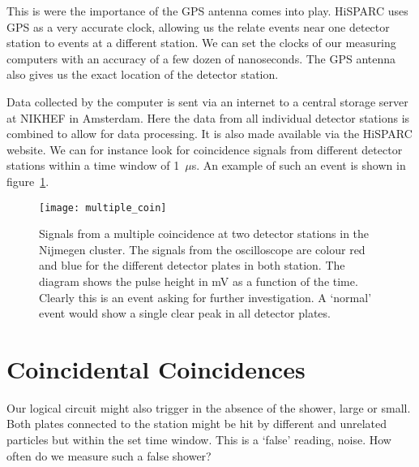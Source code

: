 This is were the importance of the GPS antenna comes into play. HiSPARC uses GPS as a very accurate clock, allowing us the relate events near one detector station to events at a different station. We can set the clocks of our measuring computers with an accuracy of a few dozen of nanoseconds. The GPS antenna also gives us the exact location of the detector station.

Data collected by the computer is sent via an internet to a central storage server at NIKHEF in Amsterdam. Here the data from all individual detector stations is combined to allow for data processing. It is also made available via the HiSPARC website. We can for instance look for coincidence signals from different detector stations within a time window of 1~$\mu$s. An example of such an event is shown in figure~\ref{fig:multiple_coin}.

\begin{figure}\begin{center}
\texttt{[image: multiple\_coin]}
\caption{Signals from a multiple coincidence at two detector stations in the Nijmegen cluster. The signals from the oscilloscope are colour red and blue for the different detector plates in both station. The diagram shows the pulse height in mV as a function of the time. Clearly this is an event asking for further investigation. A `normal' event would show a single clear peak in all detector plates.\protect\footnotemark}\label{fig:multiple_coin}
\end{center}\end{figure}


\section{Coincidental Coincidences}
Our logical circuit might also trigger in the absence of the shower, large or small. Both plates connected to the station might be hit by different and unrelated particles but within the set time window. This is a `false' reading, noise. How often do we measure such a false shower?

